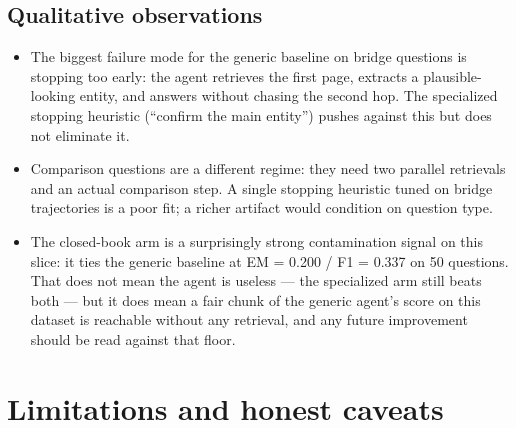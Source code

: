 \documentclass[11pt,a4paper]{article}
\begin{document}
\subsection{Qualitative observations}

\begin{itemize}[leftmargin=*]
    \item The biggest failure mode for the generic baseline on bridge
          questions is stopping too early: the agent retrieves the first
          page, extracts a plausible-looking entity, and answers without
          chasing the second hop. The specialized stopping heuristic
          (``confirm the main entity'') pushes against this but does not
          eliminate it.
    \item Comparison questions are a different regime: they need two
          parallel retrievals and an actual comparison step. A single
          stopping heuristic tuned on bridge trajectories is a poor fit;
          a richer artifact would condition on question type.
    \item The closed-book arm is a surprisingly strong contamination
          signal on this slice: it ties the generic baseline at EM =
          0.200 / F1 = 0.337 on 50 questions. That does not mean the
          agent is useless --- the specialized arm still beats both ---
          but it does mean a fair chunk of the generic agent's score
          on this dataset is reachable without any retrieval, and any
          future improvement should be read against that floor.
\end{itemize}

\section{Limitations and honest caveats}
\end{document}

